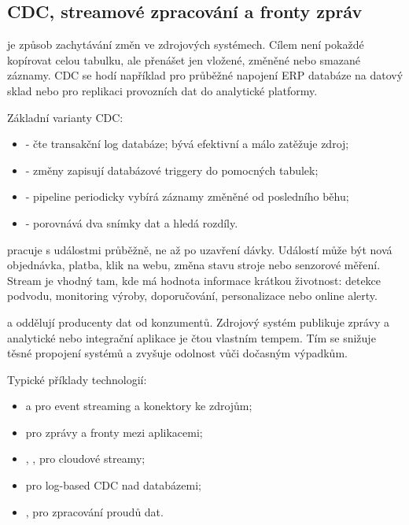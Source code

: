 \subsection{CDC, streamové zpracování a fronty zpráv}
 je způsob zachytávání změn ve zdrojových systémech. Cílem není
pokaždé kopírovat celou tabulku, ale přenášet jen vložené, změněné nebo smazané záznamy. CDC se
hodí například pro průběžné napojení ERP databáze na datový sklad nebo pro replikaci provozních dat
do analytické platformy.

Základní varianty CDC:
\begin{itemize}
  \item {} - čte transakční log databáze; bývá efektivní a málo zatěžuje zdroj;
  \item {} - změny zapisují databázové triggery do pomocných tabulek;
  \item {} - pipeline periodicky vybírá záznamy změněné od posledního běhu;
  \item {} - porovnává dva snímky dat a hledá rozdíly.
\end{itemize}

 pracuje s událostmi průběžně, ne až po uzavření dávky. Událostí může být
nová objednávka, platba, klik na webu, změna stavu stroje nebo senzorové měření. Stream je vhodný
tam, kde má hodnota informace krátkou životnost: detekce podvodu, monitoring výroby, doporučování,
personalizace nebo online alerty.

 a  oddělují producenty dat od konzumentů. Zdrojový
systém publikuje zprávy a analytické nebo integrační aplikace je čtou vlastním tempem. Tím se snižuje
těsné propojení systémů a zvyšuje odolnost vůči dočasným výpadkům.

Typické příklady technologií:
\begin{itemize}
  \item {} a  pro event streaming a konektory ke zdrojům;
  \item {} pro zprávy a fronty mezi aplikacemi;
  \item {}, ,  pro cloudové streamy;
  \item {} pro log-based CDC nad databázemi;
  \item {},  pro zpracování proudů dat.
\end{itemize}

